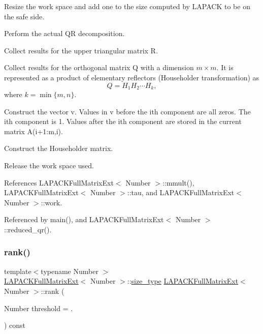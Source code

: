 Resize the work space and add one to the size computed by L\+A\+P\+A\+CK to be on the safe side.

Perform the actual QR decomposition.

Collect results for the upper triangular matrix {\ttfamily R}.

Collect results for the orthogonal matrix {\ttfamily Q} with a dimension $m \times m$. It is represented as a product of elementary reflectors (Householder transformation) as \[ Q = H_1 H_2 \cdots H_k, \] where $k = \min\{m, n\}$.

Construct the vector {\ttfamily v}. Values in {\ttfamily v} before the i\textquotesingle{}th component are all zeros. The i\textquotesingle{}th component is 1. Values after the i\textquotesingle{}th component are stored in the current matrix {\ttfamily A}(i+1\+:m,i).

Construct the Householder matrix.

Release the work space used.

References L\+A\+P\+A\+C\+K\+Full\+Matrix\+Ext$<$ Number $>$\+::mmult(), L\+A\+P\+A\+C\+K\+Full\+Matrix\+Ext$<$ Number $>$\+::tau, and L\+A\+P\+A\+C\+K\+Full\+Matrix\+Ext$<$ Number $>$\+::work.



Referenced by main(), and L\+A\+P\+A\+C\+K\+Full\+Matrix\+Ext$<$ Number $>$\+::reduced\+\_\+qr().

\mbox{\label{classLAPACKFullMatrixExt_a94f6a6df2b48201549f58bcbadcc6053}} 
\subsubsection{\texorpdfstring{rank()}{rank()}}
{\footnotesize\ttfamily template$<$typename Number $>$ \\
\hyperlink{classLAPACKFullMatrixExt}{L\+A\+P\+A\+C\+K\+Full\+Matrix\+Ext}$<$ Number $>$\+::\hyperlink{classLAPACKFullMatrixExt_a5cf5f4a6104dc17029210b5ca52bf574}{size\+\_\+type} \hyperlink{classLAPACKFullMatrixExt}{L\+A\+P\+A\+C\+K\+Full\+Matrix\+Ext}$<$ Number $>$\+::rank (\begin{DoxyParamCaption}\item[{Number}]{threshold = {.} }\end{DoxyParamCaption}) const}

